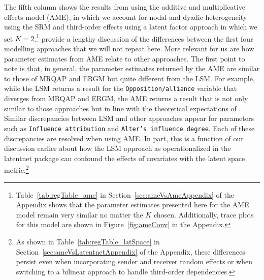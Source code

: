 \documentclass[12pt,onesided,pdflatex]{amsart}
\newcommand{\pkg}[1]{{\fontseries{b}\selectfont #1}}
\begin{document}
The fifth column shows the results from using the additive and multiplicative effects model (AME), in which we account for nodal and dyadic heterogeneity using the SRM and third-order effects using a latent factor approach in which we set $K=2$.\footnote{Table~\ref{tab:regTable_ame} in Section~\ref{sec:ameVsAmeAppendix} of the Appendix shows that the parameter estimates presented here for the AME model remain very similar no matter the $K$ chosen. Additionally, trace plots for this model are shown in Figure~\ref{fig:ameConv} in the Appendix.} \citet{cranmer:etal:2016} provide a lengthy discussion of the differences between the first four modelling approaches that we will not repeat here. More relevant for us are how parameter estimates from AME relate to other approaches. The first point to note is that, in general, the parameter estimates returned by the AME are similar to those of MRQAP and ERGM but quite different from the LSM. For example, while the LSM returns a result for the \texttt{Opposition/alliance} variable that diverges from MRQAP and ERGM, the AME returns a result that is not only similar to those approaches but in line with the theoretical expectations of \citet{ingold:fischer:2014}. Similar discrepancies between LSM and other approaches appear for parameters such as \texttt{Influence attribution} and \texttt{Alter's influence degree}. Each of these discrepancies are resolved when using AME. In part, this is a function of our discussion earlier about how the LSM approach as operationalized in the \pkg{latentnet} package can confound the effects of covariates with the latent space metric.\footnote{As shown in Table~\ref{tab:regTable_latSpace} in Section~\ref{sec:ameVsLatentnetAppendix} of the Appendix, these differences persist even when incorporating sender and receiver random effects or when switching to a bilinear approach to handle third-order dependencies.} %
\end{document}
